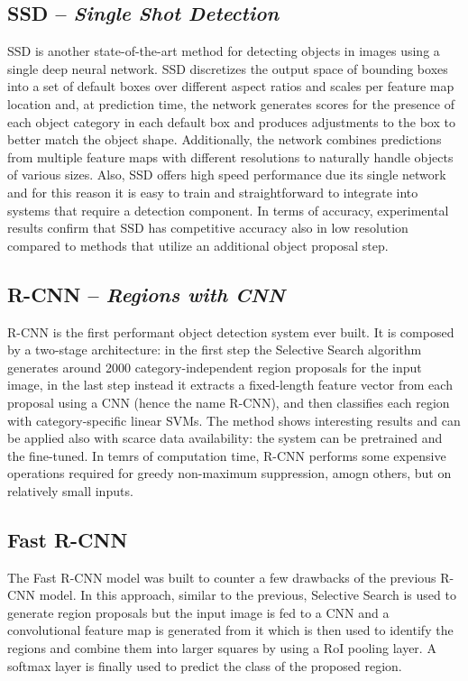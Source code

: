 \subsection{SSD -- \emph{Single Shot Detection}}

SSD is another state-of-the-art method for detecting objects in images
using a single deep neural network. SSD discretizes the output space
of bounding boxes into a set of default boxes over different aspect
ratios and scales per feature map location and, at prediction time,
the network generates scores for the presence of each object category
in each default box and produces adjustments to the box to better
match the object shape. Additionally, the network combines predictions
from multiple feature maps with diﬀerent resolutions to naturally
handle objects of various sizes. Also, SSD offers high speed
performance due its single network and for this reason it is easy to
train and straightforward to integrate into systems that require a
detection component. In terms of accuracy, experimental results conﬁrm
that SSD has competitive accuracy also in low resolution compared to
methods that utilize an additional object proposal step.

\subsection{R-CNN -- \emph{Regions with CNN}}

R-CNN is the first performant object detection system ever built. It
is composed by a two-stage architecture: in the first step the
Selective Search algorithm generates around 2000 category-independent
region proposals for the input image, in the last step instead it
extracts a fixed-length feature vector from each proposal using a CNN
(hence the name R-CNN), and then classifies each region with
category-specific linear SVMs. The method shows interesting results
and can be applied also with scarce data availability: the system can
be pretrained and the fine-tuned. In temrs of computation time, R-CNN
performs some expensive operations required for greedy non-maximum
suppression, amogn others, but on relatively small inputs.

\subsection{Fast R-CNN}

The Fast R-CNN model was built to counter a few drawbacks of the
previous R-CNN model. In this approach, similar to the previous,
Selective Search is used to generate region proposals but the input
image is fed to a CNN and a convolutional feature map is generated
from it which is then used to identify the regions and combine them
into larger squares by using a RoI pooling layer. A softmax layer is
finally used to predict the class of the proposed region.

